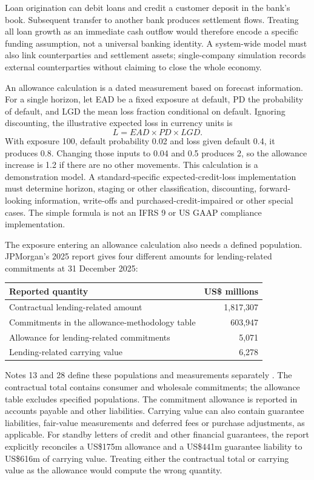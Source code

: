 Loan origination can debit loans and credit a customer deposit in the bank's
book. Subsequent transfer to another bank produces settlement flows. Treating
all loan growth as an immediate cash outflow would therefore encode a specific
funding assumption, not a universal banking identity. A system-wide model must
also link counterparties and settlement assets; single-company simulation
records external counterparties without claiming to close the whole economy.

\newpage
An allowance calculation is a dated measurement based on forecast information.
For a single horizon, let EAD be a fixed exposure at default, PD the probability
of default, and LGD the mean loss fraction conditional on default. Ignoring
discounting, the illustrative expected loss in currency units is
\[
 L=EAD\times PD\times LGD.
\]
With exposure 100, default probability 0.02 and loss given default 0.4, it
produces 0.8. Changing those inputs to 0.04 and 0.5 produces 2, so the allowance
increase is 1.2 if there are no other movements. This calculation is a
demonstration model. A standard-specific expected-credit-loss implementation
must determine horizon, staging or other classification, discounting,
forward-looking information, write-offs and purchased-credit-impaired or
other special cases. The simple formula is not an IFRS 9 or US GAAP compliance
implementation.

The exposure entering an allowance calculation also needs a defined
population. JPMorgan's 2025 report gives four different amounts for
lending-related commitments at 31 December 2025:
\begin{center}
\begin{tabularx}{\linewidth}{@{}Xr@{}}
\toprule
Reported quantity & US\$ millions \\
\midrule
Contractual lending-related amount & 1,817,307 \\
Commitments in the allowance-methodology table & 603,947 \\
Allowance for lending-related commitments & 5,071 \\
Lending-related carrying value & 6,278 \\
\bottomrule
\end{tabularx}
\end{center}
Notes 13 and 28 define these populations and measurements separately
\citep[pp.~258--262, 295--297]{jpmorgan2025tenk}. The contractual total
contains consumer and wholesale commitments; the allowance table excludes
specified populations. The commitment allowance is reported in accounts
payable and other liabilities. Carrying value can also contain guarantee
liabilities, fair-value measurements and deferred fees or purchase adjustments,
as applicable. For standby letters of credit and other financial guarantees,
the report explicitly reconciles a US\$175m allowance and a US\$441m guarantee
liability to US\$616m of carrying value. Treating either the contractual total
or carrying value as the allowance would compute the wrong quantity.

